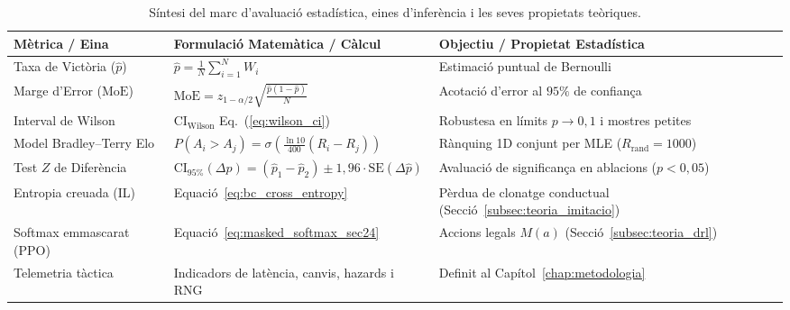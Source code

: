 \begin{table}[htbp]
    \centering
    \small
    \renewcommand{\arraystretch}{1.3}
    \begin{tabularx}{\textwidth}{l>{\raggedright\arraybackslash}X>{\raggedright\arraybackslash}p{4.4cm}}
        \toprule
        \textbf{Mètrica / Eina}        & \textbf{Formulació Matemàtica / Càlcul}                                                               & \textbf{Objectiu / Propietat Estadística}             \\
        \midrule
        Taxa de Victòria ($\hat{p}$)   & $\hat{p} = \frac{1}{N} \sum_{i=1}^N W_i$                                                              & Estimació puntual de Bernoulli                        \\
        \arrayrulecolor{gray!30}\hline\arrayrulecolor{black}
        Marge d'Error ($\mathrm{MoE}$) & $\mathrm{MoE} = z_{1-\alpha/2} \sqrt{\frac{\hat{p}(1-\hat{p})}{N}}$                                   & Acotació d'error al $95\%$ de confiança               \\
        \arrayrulecolor{gray!30}\hline\arrayrulecolor{black}
        Interval de Wilson             & $\mathrm{CI}_{\mathrm{Wilson}}$ Eq.~(\ref{eq:wilson_ci})                                              & Robustesa en límits $p \to 0,1$ i mostres petites     \\
        \arrayrulecolor{gray!30}\hline\arrayrulecolor{black}
        Model Bradley--Terry Elo       & $P(A_i > A_j) = \sigma\left(\frac{\ln 10}{400}(R_i - R_j)\right)$                                     & Rànquing 1D conjunt per MLE ($R_{\text{rand}}=1000$)  \\
        \arrayrulecolor{gray!30}\hline\arrayrulecolor{black}
        Test $Z$ de Diferència         & $\mathrm{CI}_{95\%}(\Delta p) = (\hat{p}_1 - \hat{p}_2) \pm 1{,}96 \cdot \mathrm{SE}(\Delta \hat{p})$ & Avaluació de significança en ablacions ($p < 0{,}05$) \\
        \arrayrulecolor{gray!30}\hline\arrayrulecolor{black}
        Entropia creuada (IL)          & Equació~\ref{eq:bc_cross_entropy}                                                                      & Pèrdua de clonatge conductual (Secció~\ref{subsec:teoria_imitacio}) \\
        \arrayrulecolor{gray!30}\hline\arrayrulecolor{black}
        Softmax emmascarat (PPO)       & Equació~\ref{eq:masked_softmax_sec24}                                                                  & Accions legals $M(a)$ (Secció~\ref{subsec:teoria_drl}) \\
        \arrayrulecolor{gray!30}\hline\arrayrulecolor{black}
        Telemetria tàctica             & Indicadors de latència, canvis, hazards i RNG                                                          & Definit al Capítol~\ref{chap:metodologia}             \\
        \bottomrule
    \end{tabularx}
    \caption{Síntesi del marc d'avaluació estadística, eines d'inferència i les seves propietats teòriques.}
    \label{tab:stat_framework_summary}
\end{table}

